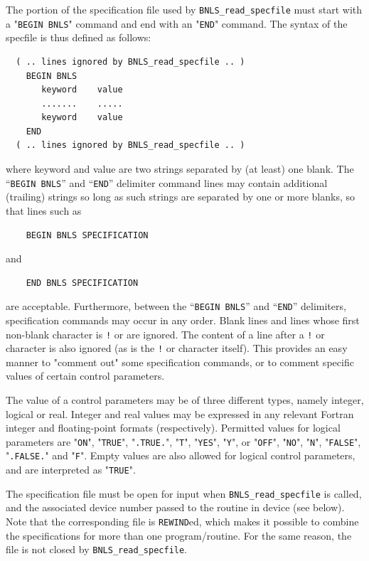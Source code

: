 \documentclass{galahad}
\newcommand{\packagename}{BNLS}
\begin{document}
The portion of the specification file used by
{\tt \packagename\_read\_specfile}
must start
with a "{\tt BEGIN \packagename}" command and end with an
"{\tt END}" command.  The syntax of the specfile is thus defined as follows:
\begin{verbatim}
  ( .. lines ignored by BNLS_read_specfile .. )
    BEGIN BNLS
       keyword    value
       .......    .....
       keyword    value
    END
  ( .. lines ignored by BNLS_read_specfile .. )
\end{verbatim}
where keyword and value are two strings separated by (at least) one blank.
The ``{\tt BEGIN \packagename}'' and ``{\tt END}'' delimiter command lines
may contain additional (trailing) strings so long as such strings are
separated by one or more blanks, so that lines such as
\begin{verbatim}
    BEGIN BNLS SPECIFICATION
\end{verbatim}
and
\begin{verbatim}
    END BNLS SPECIFICATION
\end{verbatim}
are acceptable. Furthermore,
between the
``{\tt BEGIN \packagename}'' and ``{\tt END}'' delimiters,
specification commands may occur in any order.  Blank lines and
lines whose first non-blank character is {\tt !} or {\tt *} are ignored.
The content
of a line after a {\tt !} or {\tt *} character is also
ignored (as is the {\tt !} or {\tt *}
character itself). This provides an easy manner to "comment out" some
specification commands, or to comment specific values
of certain control parameters.

The value of a control parameters may be of three different types, namely
integer, logical or real.
Integer and real values may be expressed in any relevant Fortran integer and
floating-point formats (respectively). Permitted values for logical
parameters are "{\tt ON}", "{\tt TRUE}", "{\tt .TRUE.}", "{\tt T}",
"{\tt YES}", "{\tt Y}", or "{\tt OFF}", "{\tt NO}",
"{\tt N}", "{\tt FALSE}", "{\tt .FALSE.}" and "{\tt F}".
Empty values are also allowed for
logical control parameters, and are interpreted as "{\tt TRUE}".

The specification file must be open for
input when {\tt \packagename\_read\_specfile}
is called, and the associated device number
passed to the routine in device (see below).
Note that the corresponding
file is {\tt REWIND}ed, which makes it possible to combine the specifications
for more than one program/routine.  For the same reason, the file is not
closed by {\tt \packagename\_read\_specfile}.
\end{document}
